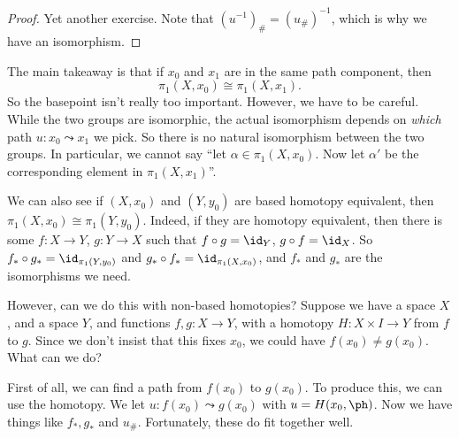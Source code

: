 \documentclass[a4paper]{article}
\begin{document}
\begin{proof}
  Yet another exercise. Note that $(u^{-1})_\# = (u_\#)^{-1}$, which is why we have an isomorphism.
\end{proof}
The main takeaway is that if $x_0$ and $x_1$ are in the same path component, then
\[
  \pi_1(X, x_0) \cong \pi_1(X, x_1).
\]
So the basepoint isn't really too important. However, we have to be careful. While the two groups are isomorphic, the actual isomorphism depends on \emph{which} path $u: x_0 \leadsto x_1$ we pick. So there is no natural isomorphism between the two groups. In particular, we cannot say ``let $\alpha \in \pi_1(X, x_0)$. Now let $\alpha'$ be the corresponding element in $\pi_1(X, x_1)$''.

We can also see if $(X, x_0)$ and $(Y, y_0)$ are based homotopy equivalent, then $\pi_1(X, x_0)\cong \pi_1(Y, y_0)$. Indeed, if they are homotopy equivalent, then there is some $f: X \to Y$, $g: Y \to X$ such that $f\circ g = \id_Y$, $g\circ f = \id_X$. So $f_*\circ g_* = \id_{\pi_1(Y, y_0)}$ and $g_*\circ f_* = \id_{\pi_1(X, x_0)}$, and $f_*$ and $g_*$ are the isomorphisms we need.

However, can we do this with non-based homotopies? Suppose we have a space $X$, and a space $Y$, and functions $f, g: X \to Y$, with a homotopy $H: X\times I \to Y$ from $f$ to $g$. Since we don't insist that this fixes $x_0$, we could have $f(x_0) \not= g(x_0)$. What can we do?

First of all, we can find a path from $f(x_0)$ to $g(x_0)$. To produce this, we can use the homotopy. We let $u: f(x_0) \leadsto g(x_0)$ with $u = H(x_0, \ph)$. Now we have things like $f_*, g_*$ and $u_\#$. Fortunately, these do fit together well.
\begin{center}
\end{center}
\end{document}
